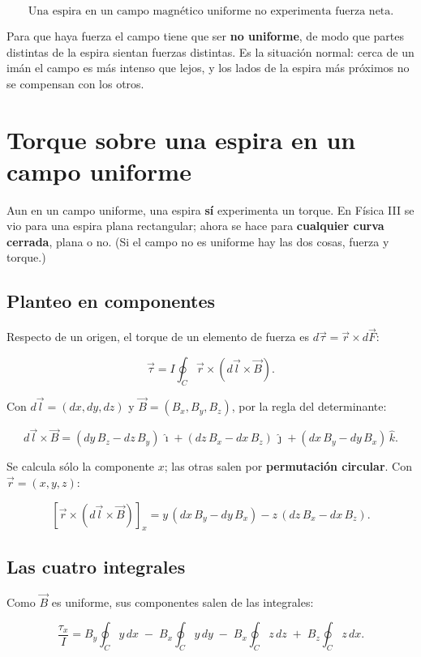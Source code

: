 \documentclass[12pt,a4paper]{article}
\begin{document}
\begin{keybox}
\[
\boxed{\ \text{Una espira en un campo magnético uniforme no experimenta fuerza neta.}\ }
\]
\end{keybox}

Para que haya fuerza el campo tiene que ser \textbf{no uniforme}, de modo que partes
distintas de la espira sientan fuerzas distintas. Es la situación normal: cerca
de un imán el campo es más intenso que lejos, y los lados de la espira más
próximos no se compensan con los otros.

\section{Torque sobre una espira en un campo uniforme}

Aun en un campo uniforme, una espira \textbf{sí} experimenta un torque. En Física III
se vio para una espira plana rectangular; ahora se hace para \textbf{cualquier curva
cerrada}, plana o no. (Si el campo no es uniforme hay las dos cosas, fuerza y
torque.)

\subsection{Planteo en componentes}

Respecto de un origen, el torque de un elemento de fuerza es
$d\vec\tau = \vec r\times d\vec F$:

\[
\vec\tau = I\oint_C \vec r\times\left(d\vec l\times\vec B\right).
\]

Con $d\vec l = (dx, dy, dz)$ y $\vec B = (B_x, B_y, B_z)$, por la regla del
determinante:

\[
d\vec l\times\vec B =
(dy\,B_z - dz\,B_y)\,\hat\imath
+ (dz\,B_x - dx\,B_z)\,\hat\jmath
+ (dx\,B_y - dy\,B_x)\,\hat k .
\]

Se calcula sólo la componente $x$; las otras salen por \textbf{permutación circular}.
Con $\vec r = (x,y,z)$:

\[
\left[\vec r\times(d\vec l\times\vec B)\right]_x
= y\,(dx\,B_y - dy\,B_x) - z\,(dz\,B_x - dx\,B_z).
\]

\subsection{Las cuatro integrales}

Como $\vec B$ es uniforme, sus componentes salen de las integrales:

\[
\frac{\tau_x}{I} = B_y\oint_C y\,dx \;-\; B_x\oint_C y\,dy
\;-\; B_x\oint_C z\,dz \;+\; B_z\oint_C z\,dx .
\]
\end{document}
